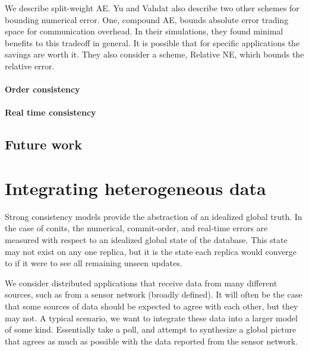\documentclass[]             %
{NASA}                       %
\theoremstyle{definition}
\begin{document}
We describe split-weight AE. Yu and Vahdat also describe two other
schemes for bounding numerical error. One, compound AE, bounds absolute
error trading space for communication overhead. In their simulations,
they found minimal benefits to this tradeoff in general. It is possible
that for specific applications the savings are worth it. They also
consider a scheme, Relative NE, which bounds the relative error.

\hypertarget{order-consistency-1}{%
\paragraph{Order consistency}\label{order-consistency-1}}

\hypertarget{real-time-consistency-1}{%
\paragraph{Real time consistency}\label{real-time-consistency-1}}

\hypertarget{future-work}{%
\subsection{Future work}\label{future-work}}

\hypertarget{integrating-heterogeneous-data}{%
\section{Integrating heterogeneous
data}\label{integrating-heterogeneous-data}}

\label{sec:sheaf}

Strong consistency models provide the abstraction of an idealized global
truth. In the case of conits, the numerical, commit-order, and real-time
errors are measured with respect to an idealized global state of the
database. This state may not exist on any one replica, but it is the
state each replica would converge to if it were to see all remaining
unseen updates.

We consider distributed applications that receive data from many
different sources, such as from a sensor network (broadly defined). It
will often be the case that some sources of data should be expected to
agree with each other, but they may not. A typical scenario, we want to
integrate these data into a larger model of some kind. Essentially take
a poll, and attempt to synthesize a global picture that agrees as much
as possible with the data reported from the sensor network.
\end{document}
